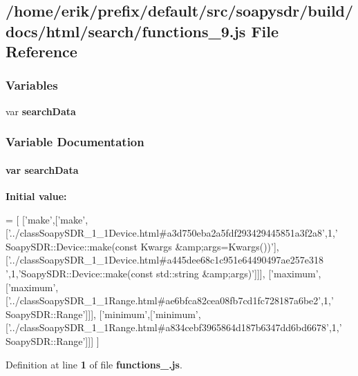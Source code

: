 \subsection{/home/erik/prefix/default/src/soapysdr/build/docs/html/search/functions\+\_\+9.js File Reference}
\label{functions__9_8js}
\subsubsection*{Variables}
\begin{DoxyCompactItemize}
\item 
var {\bf search\+Data}
\end{DoxyCompactItemize}


\subsubsection{Variable Documentation}
\paragraph[{search\+Data}]{\setlength{\rightskip}{0pt plus 5cm}var search\+Data}\label{functions__9_8js_ad01a7523f103d6242ef9b0451861231e}
{\bfseries Initial value\+:}
\begin{DoxyCode}
=
[
  [\textcolor{stringliteral}{'make'},[\textcolor{stringliteral}{'make'},[\textcolor{stringliteral}{'../classSoapySDR\_1\_1Device.html#a3d750eba2a5fdf293429445851a3f2a8'},1,\textcolor{stringliteral}{'
      SoapySDR::Device::make(const Kwargs &amp;args=Kwargs())'}],[\textcolor{stringliteral}{'../classSoapySDR\_1\_1Device.html#a445dee68c1c951e64490497ae257e318
      '},1,\textcolor{stringliteral}{'SoapySDR::Device::make(const std::string &amp;args)'}]]],
  [\textcolor{stringliteral}{'maximum'},[\textcolor{stringliteral}{'maximum'},[\textcolor{stringliteral}{'../classSoapySDR\_1\_1Range.html#ae6bfca82cea08fb7cd1fc728187a6be2'},1,\textcolor{stringliteral}{'
      SoapySDR::Range'}]]],
  [\textcolor{stringliteral}{'minimum'},[\textcolor{stringliteral}{'minimum'},[\textcolor{stringliteral}{'../classSoapySDR\_1\_1Range.html#a834cebf3965864d187b6347dd6bd6678'},1,\textcolor{stringliteral}{'
      SoapySDR::Range'}]]]
]
\end{DoxyCode}


Definition at line {\bf 1} of file {\bf functions\+\_.\+js}.

